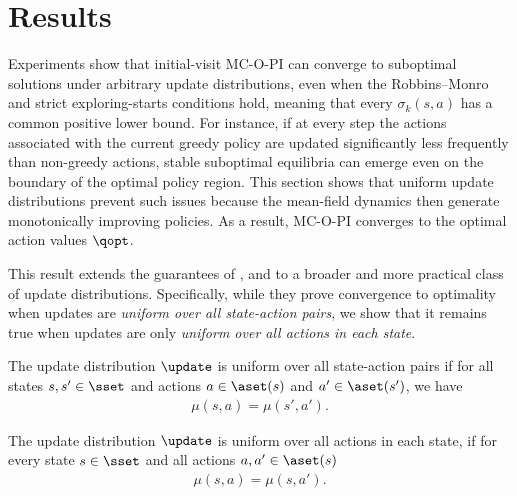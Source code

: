 \section{Results}
\label{sec: results}



Experiments show that initial-visit MC-O-PI can converge to suboptimal solutions under arbitrary update distributions, even when the Robbins–Monro 
and strict exploring-starts conditions hold, meaning that every $\sigma_k(s,a)$ has a common positive lower bound.
For instance, if at every step the actions associated with the current greedy policy are updated significantly less frequently than non-greedy actions, stable suboptimal equilibria can emerge even on the boundary of the optimal policy region.
This section shows that uniform update distributions prevent such issues because the mean-field dynamics then generate monotonically improving policies.
As a result, MC-O-PI converges to the optimal action values $\qopt$.

This result extends the guarantees of \citet{Tsitsiklis2002OnIteration}, \citet{Chen2018OnProblem} and \citet{Liu2021OnStarts} to a broader and more practical class of update distributions.
Specifically, while they prove convergence to optimality when updates are \textit{uniform over all state-action pairs}, we show that it remains true when updates are only \textit{uniform over all actions in each state}.

\begin{definition}
\label{asp: unbiased tsitsiklis}
The update distribution $\update$ is uniform over all state-action pairs
if for all states $s, s' \in \sset$ and actions $a \in \aset(s)$ and $a' \in \aset(s')$, we have
\begin{align*}
    \mu(s, a) = \mu(s', a') .
\end{align*}
\end{definition}

\begin{definition}
\label{asp: unbiased over policies}
The update distribution $\update$ is uniform over all actions in each state,
if for every state $s \in \sset$ and all actions $a, a' \in \aset(s)$
\begin{align*}
    \mu(s, a) = \mu(s, a') .
\end{align*}
\end{definition}

